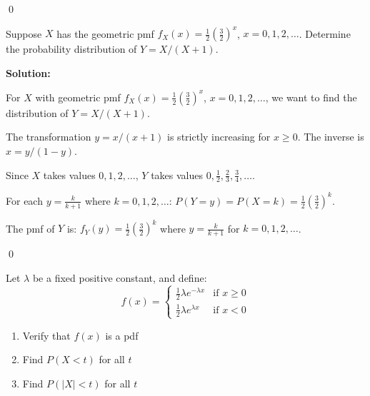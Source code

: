\qed
\begin{problembox}
Suppose $X$ has the geometric pmf $f_X(x) = \frac{1}{2}(\frac{3}{2})^x$, $x = 0, 1, 2, \ldots$. Determine the probability distribution of $Y = X/(X+1)$.
\end{problembox}

\noindent\textbf{Solution:}

For $X$ with geometric pmf $f_X(x) = \frac{1}{2}(\frac{3}{2})^x$, $x = 0, 1, 2, \ldots$, we want to find the distribution of $Y = X/(X+1)$.

The transformation $y = x/(x+1)$ is strictly increasing for $x \geq 0$. The inverse is $x = y/(1-y)$.

Since $X$ takes values $0, 1, 2, \ldots$, $Y$ takes values $0, \frac{1}{2}, \frac{2}{3}, \frac{3}{4}, \ldots$.

For each $y = \frac{k}{k+1}$ where $k = 0, 1, 2, \ldots$:
$P(Y = y) = P(X = k) = \frac{1}{2}(\frac{3}{2})^k$.

The pmf of $Y$ is:
$f_Y(y) = \frac{1}{2}(\frac{3}{2})^k$ where $y = \frac{k}{k+1}$ for $k = 0, 1, 2, \ldots$.


\qed
\begin{problembox}
Let $\lambda$ be a fixed positive constant, and define:
\[ f(x) = \begin{cases}
\frac{1}{2}\lambda e^{-\lambda x} & \text{if } x \geq 0 \\
\frac{1}{2}\lambda e^{\lambda x} & \text{if } x < 0
\end{cases} \]
\begin{enumerate}[label=(\alph*)]
    \item Verify that $f(x)$ is a pdf
    \item Find $P(X < t)$ for all $t$
    \item Find $P(|X| < t)$ for all $t$
\end{enumerate}
\end{problembox}

